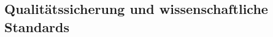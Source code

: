 \documentclass[11pt,a4paper]{article}
\begin{document}
    \subsection{Qualitätssicherung und wissenschaftliche Standards}
\end{document}
